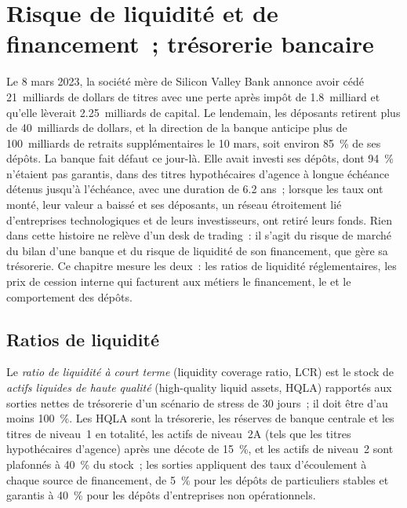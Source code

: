 \chapter{Risque de liquidité et de financement~; trésorerie bancaire}\label{ch:rc:liquidity-and-funding-risk-bank-treasury}

Le 8 mars 2023, la société mère de Silicon Valley Bank annonce avoir cédé 21~milliards de dollars de
titres avec une perte après impôt de 1.8~milliard et qu'elle lèverait 2.25~milliards de capital. Le
lendemain, les déposants retirent plus de 40~milliards de dollars, et la direction de la banque anticipe
plus de 100~milliards de retraits supplémentaires le 10 mars, soit environ 85~\% de ses dépôts. La banque fait défaut ce jour-là.
Elle avait investi ses dépôts, dont 94~\% n'étaient pas garantis, dans des titres hypothécaires d'agence à longue échéance
détenus jusqu'à l'échéance, avec une duration de 6.2 ans~; lorsque les taux ont monté, leur valeur a baissé et ses
déposants, un réseau étroitement lié d'entreprises technologiques et de leurs investisseurs, ont retiré leurs fonds. Rien dans
cette histoire ne relève d'un desk de trading~: il s'agit du risque de marché du bilan d'une banque et du
risque de liquidité de son financement, que gère sa trésorerie. Ce chapitre mesure les deux~: les
ratios de liquidité réglementaires, les prix de cession interne qui facturent aux métiers le financement, le
 et le comportement des dépôts.

\section{Ratios de liquidité}

\begin{definition}\label{def:rc:liquidity-and-funding-risk-bank-treasury:lcr}
Le \emph{ratio de liquidité à court terme} (liquidity coverage ratio, LCR) est le stock de
\emph{actifs liquides de haute qualité} (high-quality liquid assets, HQLA) rapportés aux sorties nettes de trésorerie
d'un scénario de stress de 30 jours~; il doit être d'au moins 100~\%. Les HQLA sont la trésorerie, les réserves de banque centrale et
les titres de niveau~1 en totalité, les actifs de niveau~2A (tels que les titres hypothécaires d'agence) après une décote de 15~\%,
et les actifs de niveau~2 sont plafonnés à 40~\% du stock~; les sorties appliquent des taux d'écoulement à chaque source de financement,
de 5~\% pour les dépôts de particuliers stables et garantis à 40~\% pour les dépôts d'entreprises non opérationnels.
\end{definition}

